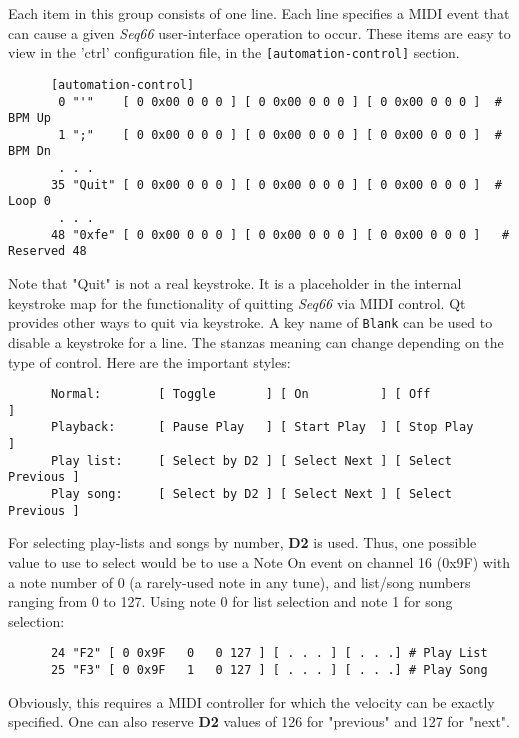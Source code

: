    Each item in this group consists of one line.  Each line
   specifies a MIDI event that can cause a given
   \textsl{Seq66} user-interface operation to occur.
   These items are easy to view in the 'ctrl' configuration file,
   in the \texttt{[automation-control]} section.

   \begin{verbatim}
      [automation-control]
       0 "'"    [ 0 0x00 0 0 0 ] [ 0 0x00 0 0 0 ] [ 0 0x00 0 0 0 ]  # BPM Up
       1 ";"    [ 0 0x00 0 0 0 ] [ 0 0x00 0 0 0 ] [ 0 0x00 0 0 0 ]  # BPM Dn
       . . .
      35 "Quit" [ 0 0x00 0 0 0 ] [ 0 0x00 0 0 0 ] [ 0 0x00 0 0 0 ]  # Loop 0
       . . .
      48 "0xfe" [ 0 0x00 0 0 0 ] [ 0 0x00 0 0 0 ] [ 0 0x00 0 0 0 ]   # Reserved 48
   \end{verbatim}

   Note that "Quit" is not a real keystroke.  It is a placeholder in the internal
   keystroke map for the functionality of quitting \textsl{Seq66} via MIDI
   control.  Qt provides other ways to quit via keystroke.
   A key name of \texttt{Blank} can be used to disable a keystroke for
   a line.
   The stanzas meaning can change depending on the type of control.  Here are
   the important styles:

   \begin{verbatim}
      Normal:        [ Toggle       ] [ On          ] [ Off             ]
      Playback:      [ Pause Play   ] [ Start Play  ] [ Stop Play       ]
      Play list:     [ Select by D2 ] [ Select Next ] [ Select Previous ]
      Play song:     [ Select by D2 ] [ Select Next ] [ Select Previous ]
   \end{verbatim}

   For selecting play-lists and songs by number, \textbf{D2} is used.
   Thus, one possible value to use to select would be to use a 
   Note On event on channel 16 (0x9F) with a note number of 0 (a rarely-used
   note in any tune), and list/song numbers ranging from 0 to 127.  Using note
   0 for list selection and note 1 for song selection:

   \begin{verbatim}
      24 "F2" [ 0 0x9F   0   0 127 ] [ . . . ] [ . . .] # Play List
      25 "F3" [ 0 0x9F   1   0 127 ] [ . . . ] [ . . .] # Play Song
   \end{verbatim}

   Obviously, this requires a MIDI controller for which the velocity can be
   exactly specified.  One can also reserve \textbf{D2} values of 126 for
   "previous" and 127 for "next".

